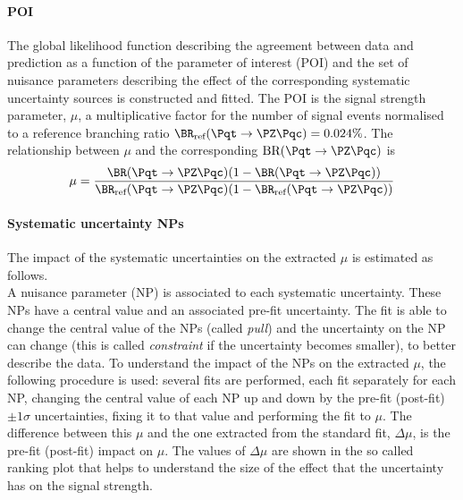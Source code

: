\paragraph{POI} The global likelihood function describing the
agreement between data and prediction as a function of the parameter
of interest (POI) and the set of nuisance parameters describing the
effect of the corresponding systematic uncertainty sources is
constructed and fitted. The POI is the signal strength parameter, $\mu$,
a multiplicative factor for the number of signal events normalised to a reference branching ratio
$\mathrm{\BR_{\text{ref}}(\Pqt\rightarrow\PZ\Pqc)=0.024\%}$.
The relationship between $\mu$ and the corresponding $\mathrm{BR (\Pqt\rightarrow\PZ\Pqc)}$  is
\begin{equation}
\mathrm{\mu=\frac{\BR(\Pqt\rightarrow\PZ\Pqc)(1-\BR(\Pqt\rightarrow\PZ\Pqc))}{\BR_{\text{ref}}(\Pqt\rightarrow\PZ\Pqc)(1-\BR_{\text{ref}}(\Pqt\rightarrow\PZ\Pqc))}}
\end{equation}

\paragraph{Systematic uncertainty NPs} The impact of the systematic
uncertainties on the extracted $\mu$ is estimated as follows. \\
A nuisance parameter (NP) is associated to each systematic uncertainty.
These NPs have a central value and an associated pre-fit uncertainty.
The fit is able to change the central value of the NPs (called \textit{pull})
and the uncertainty on the NP can change (this is called \textit{constraint}
if the uncertainty becomes smaller), to better describe the data.
To understand the impact of the NPs on the extracted $\mu$, the
following procedure is used:
several fits are performed, each fit separately for each NP,
changing the central value of each NP up and down by the pre-fit
(post-fit) $\pm 1 \sigma$ uncertainties,
fixing it to that value and performing the fit to $\mu$.
The difference between this $\mu$ and the one extracted from the
standard fit, $\Delta\mu$, is the pre-fit (post-fit) impact on $\mu$.
The values of $\Delta\mu$ are shown in the so called ranking plot that 
helps to understand the size of the effect that
the uncertainty has on the signal strength. \\

